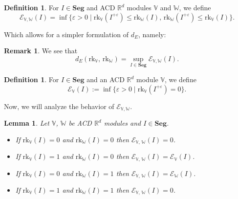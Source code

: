 \documentclass[a4paper,UKenglish,thm-restate]{article}
\newtheorem{lemma}[theorem]{Lemma}
\theoremstyle{definition}
\newtheorem{definition}[theorem]{Definition}
\newtheorem{remark}[theorem]{Remark}
\def\bbv{\mathbb{V}}
\def\bbw{\mathbb{W}}
\begin{document}
            \begin{definition}
                For $I\in\mathbf{Seg}$ and ACD $\mathbb{R}^d$ modules $\mathbb{V}$ and $\mathbb{W}$, we define \[\mathcal{E}_{\mathbb{V},\mathbb{W}}(I)=\inf\{ \varepsilon>0 \; |\; \mathrm{rk}_\mathbb{V}(I^{+\varepsilon})\leq \mathrm{rk}_\mathbb{W}(I) ,\, \mathrm{rk}_\mathbb{W}(I^{+\varepsilon})\leq \mathrm{rk}_\mathbb{V}(I)\}.\]
            \end{definition}
            Which allows for a simpler formulation of $d_E$, namely:
            \begin{remark}\label{rem:dEsup}
                We see that
                \[d_E(\mathrm{rk}_\mathbb{V},\,\mathrm{rk}_\mathbb{W})=\sup_{I\in\mathbf{Seg}} \mathcal{E}_{\mathbb{V},\mathbb{W}}(I).
                \]
            \end{remark}
            \begin{definition}
                 For $I\in\mathbf{Seg}$ and an ACD $\mathbb{R}^d$ module $\mathbb{V}$, we define \[\mathcal{E}_\mathbb{V}(I):=\inf\{\varepsilon>0\;|\;\mathrm{rk}_\mathbb{V}(I^{+\varepsilon})=0\}.\]
            \end{definition}
            Now, we will analyze the behavior of $\mathcal{E}_{\bbv, \bbw}$.
            \begin{lemma} \label{dEepscasework}
                Let $\mathbb{V}$, $\mathbb{W}$ be ACD $\mathbb{R}^d$ modules and $I\in\mathbf{Seg}$.

                \begin{itemize}
                    \item If $\mathrm{rk}_\mathbb{V}(I)=0$ and $\mathrm{rk}_\mathbb{W}(I)=0$ then $\mathcal{E}_{\mathbb{V},\,\mathbb{W}}(I)=0$.
                    \item If $\mathrm{rk}_\mathbb{V}(I)=1$ and $\mathrm{rk}_\mathbb{W}(I)=0$ then $\mathcal{E}_{\mathbb{V},\,\mathbb{W}}(I)=\mathcal{E}_\mathbb{V}(I)$.
                    \item If $\mathrm{rk}_\mathbb{V}(I)=0$ and $\mathrm{rk}_\mathbb{W}(I)=1$ then $\mathcal{E}_{\mathbb{V},\,\mathbb{W}}(I)=\mathcal{E}_\mathbb{W}(I)$.
                    \item If $\mathrm{rk}_\mathbb{V}(I)=1$ and $\mathrm{rk}_\mathbb{W}(I)=1$ then $\mathcal{E}_{\mathbb{V},\,\mathbb{W}}(I)=0$.
                \end{itemize}
            \end{lemma}
\end{document}
